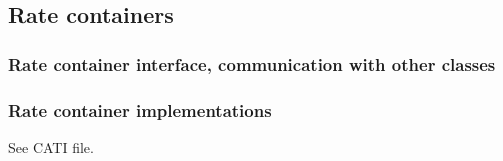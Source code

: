 \graphicspath{{\relativepath/figures/}}

\subsection{Rate containers}

\subsubsection{Rate container interface, communication with other classes}

\subsubsection{Rate container implementations}

See CATI file.
